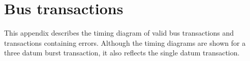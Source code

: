 \chapter{Bus transactions}
\label{appen:bus}
This appendix describes the timing diagram of valid bus transactions and
transactions containing errors. Although the timing diagrams are shown for a
three datum burst transaction, it also reflects the single datum transaction.
